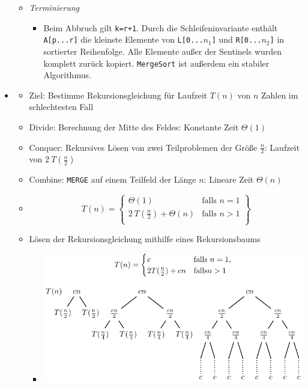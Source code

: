 \documentclass[
    12pt,
    a4paper,
    ngerman,
    color=3b,%
    marginpar=false,
    colorback=false,
    leqno,
]{tudaexercise}
\begin{document}
\begin{itemize}
\begin{itemize}
              \item \textit{Terminierung}
                    \begin{itemize}
                        \item[]
                              Beim Abbruch gilt \texttt{k=r+1}. Durch die Schleifeninvariante enthält \texttt{A[p...r]} die kleinste Elemente von
                              \texttt{L[0...$n_1$]} und \texttt{R[0...$n_2$]} in sortierter Reihenfolge. Alle Elemente außer der Sentinels wurden
                              komplett zurück kopiert. \texttt{MergeSort} ist außerdem ein stabiler Algorithmus.
                    \end{itemize}
          \end{itemize}

    \item {}
          \begin{itemize}
              \item Ziel: Bestimme Rekursionsgleichung für Laufzeit $T(n)$ von $n$ Zahlen im schlechtesten Fall
              \item Divide: Berechnung der Mitte des Feldes: Konstante Zeit $\Theta(1)$
              \item Conquer: Rekursives Lösen von zwei Teilproblemen der Größe $\frac{n}{2}$: Laufzeit von $2~T(\frac{n}{2})$
              \item Combine: \texttt{MERGE} auf einem Teilfeld der Länge $n$: Lineare Zeit $\Theta(n)$
              \item[] \[
                        T(n) = \left.
                        \begin{cases}
                            \Theta(1)                    & \text{falls } n = 1 \\
                            2~T(\frac{n}{2}) + \Theta(n) & \text{falls } n > 1 \\
                        \end{cases}
                        \right \}
                    \]
              \item Lösen der Rekursionsgleichung mithilfe eines Rekursionsbaums
                    \begin{itemize}
                        \item[] \includegraphics[width=14cm]{pictures/merge_sort_equation/merge_sort_equation}

\end{itemize}
\end{itemize}
\end{itemize}
\end{document}
